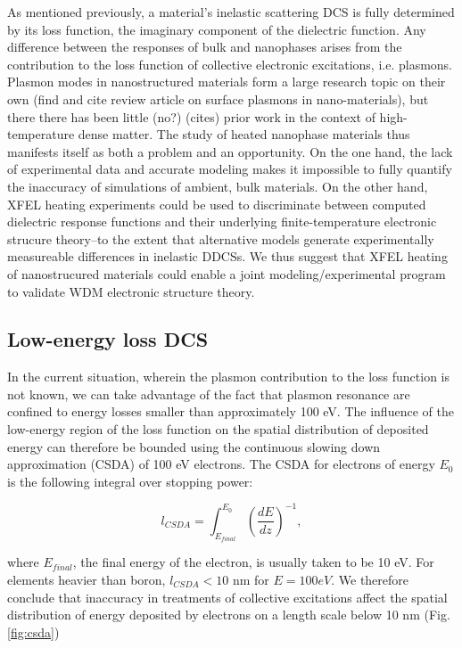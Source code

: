 \documentclass [11pt, proquest, article] {uwthesis}[2016/11/22]
\begin{document}
As mentioned previously, a material's inelastic scattering DCS is fully determined by its loss function, the imaginary component of the dielectric function. Any difference between the responses of bulk and nanophases arises from the contribution to the loss function of collective electronic excitations, i.e. plasmons. Plasmon modes in nanostructured materials form a large research topic on their own (find and cite review article on surface plasmons in nano-materials), but there there has been little (no?) (cites) prior work in the context of high-temperature dense matter. The study of heated nanophase materials thus manifests itself as both a problem and an opportunity. On the one hand, the lack of experimental data and accurate modeling makes it impossible to fully quantify the inaccuracy of simulations of ambient, bulk materials. On the other hand, XFEL heating experiments could be used to discriminate between computed dielectric response functions and their underlying finite-temperature electronic strucure theory--to the extent that alternative models generate experimentally measureable differences in inelastic DDCSs. We thus suggest that XFEL heating of nanostrucured materials could enable a joint modeling/experimental program to validate WDM electronic structure theory.

\subsection{Low-energy loss DCS} \label{ledcs}
In the current situation, wherein the plasmon contribution to the loss function is not known, we can take advantage of the fact that plasmon resonance are confined to energy losses smaller than approximately 100 eV. The influence of the low-energy region of the loss function on the spatial distribution of deposited energy can therefore be bounded using the continuous slowing down approximation (CSDA) of 100 eV electrons. The CSDA for electrons of energy $E_0$ is the following integral over stopping power: 

$$
l_{CSDA} = \int_{E_{final}} ^ {E_0} (\frac{dE}{dz})^{-1},
$$

where $E_{final}$, the final energy of the electron, is usually taken to be 10 eV. For elements heavier than boron, $l_{CSDA} < 10$ nm for $E = 100 eV$. We therefore conclude that inaccuracy in treatments of collective excitations affect the spatial distribution of energy deposited by electrons on a length scale below 10 nm (Fig. \ref{fig:csda})%
\end{document}
